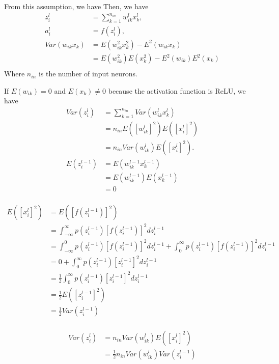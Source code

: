 \documentclass[10pt,onecolumn]{book}
\begin{document}
From this assumption, we have
Then, we have
\begin{equation}
\begin{split}
z^l_i &= \sum_{k=1}^{n_{in}} w^l_{ik} x^l_k, \\
a^l_i &= f(z^l_i), \\
Var(w_{ik} x_k) &= E(w_{ik}^2 x_k^2) - E^2(w_{ik} x_k) \\
			&= E(w_{ik}^2) E(x_k^2) - E^2(w_{ik})E^2(x_k) \\ 
\end{split}
\end{equation}
Where $n_{in}$ is the number of input neurons.

If $E(w_{ik}) = 0$ and $E(x_k) \neq 0$ because the activation function is ReLU,  we have
\begin{equation}\label{eq:msra_fp}
\begin{split}
Var(z^l_i) &= \sum_{k = 1}^{n_{in}} Var(w^l_{ik} x^l_k) \\
		&= {n_{in}} E([w^l_{ik}]^2) E([x^l_i]^2) \\
		&= n_{in} Var(w^l_{ik}) E([x^l_i]^2). \\
E(z^{l - 1}_i) &= E(w^{l - 1}_{ik} x^{l - 1}_k) \\
		&= E(w^{l - 1}_{ik}) E(x^{l - 1}_k) \\
		& = 0 \\
\end{split}
\end{equation}

\begin{equation}
\begin{split}
E([x^l_i]^2) &= E([f(z^{l-1}_i)]^2) \\
		&= \int_{-\infty}^{\infty} p(z^{l-1}_i) [f(z^{l-1}_i)]^2 dz^{l - 1}_i \\
		&= \int_{-\infty}^{0} p(z^{l-1}_i) [f(z^{l-1}_i)]^2 dz^{l - 1}_i + \int_{0}^{\infty} p(z^{l-1}_i) [f(z^{l-1}_i)]^2 dz^{l - 1}_i \\ 
		&= 0 + \int_{0}^{\infty} p(z^{l-1}_i) [z^{l-1}_i]^2 dz^{l - 1}_i \\
		&= \frac{1}{2} \int_{0}^{\infty} p(z^{l-1}_i) [z^{l-1}_i]^2 dz^{l - 1}_i \\
		&= \frac{1}{2} E([z^{l - 1}_i]^2) \\
		&= \frac{1}{2} Var(z^{l - 1}_i) \\
\end{split}
\end{equation}

\begin{equation}
\begin{split}
Var(z^l_i) &= n_{in} Var(w^l_{ik}) E([x^l_i]^2) \\
			&= \frac{1}{2} n_{in} Var(w^l_{ik})  Var(z^{l - 1}_i) \\
\end{split}
\end{equation}
\end{document}
